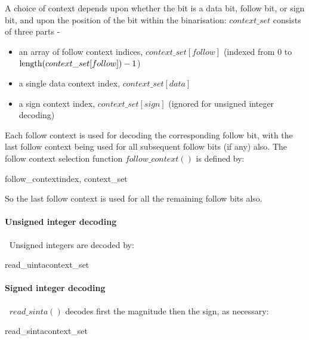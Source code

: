 A choice of context depends upon whether the bit is a data bit, follow bit, 
or sign bit, and upon the position of the bit within the binarisation: 
$context\_set$ consists of three parts -
\begin{itemize}
\item an array of follow context indices, $context\_set[follow]$ (indexed from 0 to 
$\operatorname{length}(context\_set[follow])-1$)
\item a single data context index, $context\_set[data]$ 
\item a sign context index, $context\_set[sign]$ (ignored for unsigned integer decoding)
\end{itemize}

Each follow context is used for decoding the corresponding follow bit, with the
last follow context being used for all subsequent follow bits (if any) also. 
The follow context selection function $follow\_context()$ is defined by:

\begin{pseudo}{follow\_context}{index, context\_set}
\end{pseudo}

So the last follow context is used for all the remaining follow bits also.

\paragraph{Unsigned integer decoding}
$\ $\newline
Unsigned integers are decoded by:

\begin{pseudo}{read\_uinta}{context\_set}
  \bsEND
\bsEND
{}
\end{pseudo}

\paragraph{Signed integer decoding}
$\ $\newline
$read\_sinta()$ decodes first the magnitude then the sign, as necessary:

\begin{pseudo}{read\_sinta}{context\_set}
  \bsEND
\bsEND
{}
\end{pseudo}
